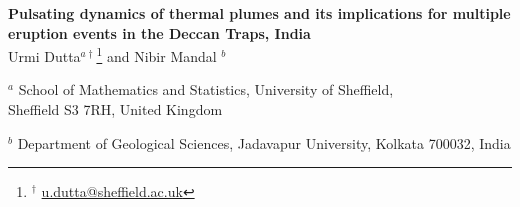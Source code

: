 \documentclass[12pt]{article}
\def\tcb{\textcolor{blue}}
\begin{document}
\begin{center}


{\large \bf Pulsating dynamics of thermal plumes and its implications
for multiple eruption events in the Deccan Traps, India} \\    
   

\vskip 0.5cm
Urmi Dutta$^{a \dagger}$\let\thefootnote\relax\footnote{$^\dagger$ \url{u.dutta@sheffield.ac.uk}}
and Nibir Mandal $^{b}$
\vskip 0.3cm

$^a$ {School of Mathematics and Statistics, University of Sheffield,  
\\Sheffield S3 7RH, United Kingdom}

\vskip 0.1cm
{$^b$ Department of Geological Sciences, Jadavapur University, Kolkata 700032, India }


\end{center}

\end{document}
